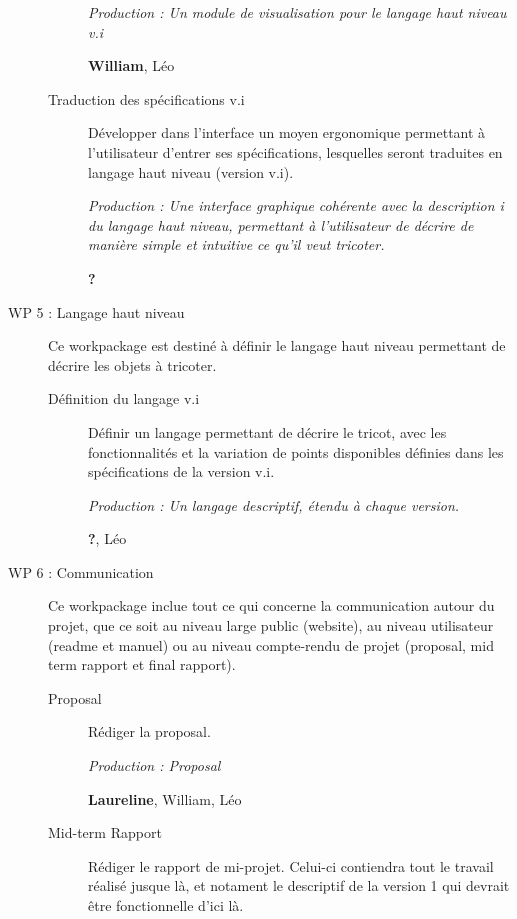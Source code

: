 \documentclass{article}
\begin{document}
\begin{description}
\begin{description}
    \textit{Production : Un module de visualisation pour le langage haut niveau v.i}

    \textbf{William}, Léo %

  \item[Traduction des spécifications v.i] Développer dans l'interface un moyen ergonomique permettant à l'utilisateur d'entrer ses spécifications, lesquelles seront traduites en langage haut niveau (version v.i).

    \textit{Production : Une interface graphique cohérente avec la description i du langage haut niveau, permettant à l'utilisateur de décrire de manière simple et intuitive ce qu'il veut tricoter.}

    \textbf{?}
  \end{description}

\medskip

\item[WP 5 : Langage haut niveau] Ce workpackage est destiné à définir le langage haut niveau permettant de décrire les objets à tricoter.

  \begin{description}
  \item[Définition du langage v.i] Définir un langage permettant de décrire le tricot, avec les fonctionnalités et la variation de points disponibles définies dans les spécifications de la version v.i.

    \textit{Production : Un langage descriptif, étendu à chaque version.}

    \textbf{?}, Léo
  \end{description}

\medskip

\item[WP 6 : Communication] Ce workpackage inclue tout ce qui concerne la communication autour du projet, que ce soit au niveau large public (website), au niveau utilisateur (readme et manuel) ou au niveau compte-rendu de projet (proposal, mid term rapport et final rapport).

  \begin{description}
  \item[Proposal] Rédiger la proposal.

    \textit{Production : Proposal}

    \textbf{Laureline}, William, Léo

  \item[Mid-term Rapport] Rédiger le rapport de mi-projet. Celui-ci contiendra tout le travail réalisé jusque là, et notament le descriptif de la version 1 qui devrait être fonctionnelle d'ici là.


\end{description}
\end{description}
\end{document}
